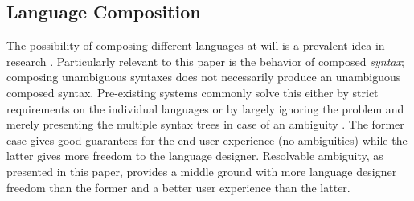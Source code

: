 \documentclass[runningheads]{llncs}
\begin{document}


\subsection{Language Composition}

The possibility of composing different languages at will is a prevalent idea in research \cite{vanwykSilverExtensibleAttribute2010,lorenzenSoundTypedependentSyntactic2016,danielssonParsingMixfixOperators2011}. Particularly relevant to this paper is the behavior of composed \emph{syntax}; composing unambiguous syntaxes does not necessarily produce an unambiguous composed syntax. Pre-existing systems commonly solve this either by strict requirements on the individual languages \cite{vanwykSilverExtensibleAttribute2010} or by largely ignoring the problem and merely presenting the multiple syntax trees in case of an ambiguity \cite{lorenzenSoundTypedependentSyntactic2016,danielssonParsingMixfixOperators2011}. The former case gives good guarantees for the end-user experience (no ambiguities) while the latter gives more freedom to the language designer. Resolvable ambiguity, as presented in this paper, provides a middle ground with more language designer freedom than the former and a better user experience than the latter.
\end{document}
